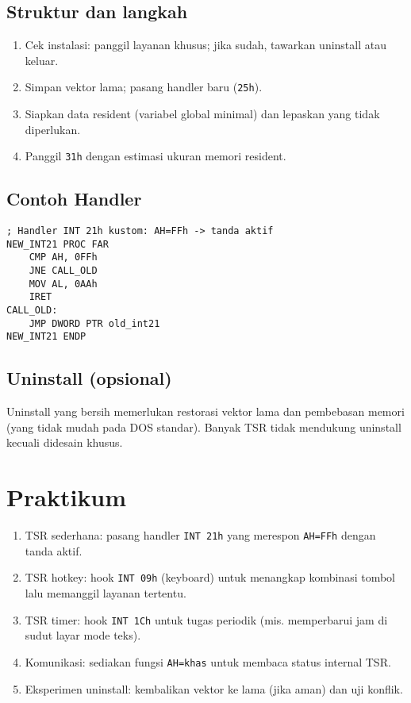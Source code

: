 \subsection{Struktur dan langkah}
\begin{enumerate}
  \item Cek instalasi: panggil layanan khusus; jika sudah, tawarkan uninstall atau keluar.
  \item Simpan vektor lama; pasang handler baru (\texttt{25h}).
  \item Siapkan data resident (variabel global minimal) dan lepaskan yang tidak diperlukan.
  \item Panggil \texttt{31h} dengan estimasi ukuran memori resident.
\end{enumerate}

\subsection{Contoh Handler}
\begin{verbatim}
; Handler INT 21h kustom: AH=FFh -> tanda aktif
NEW_INT21 PROC FAR
    CMP AH, 0FFh
    JNE CALL_OLD
    MOV AL, 0AAh
    IRET
CALL_OLD:
    JMP DWORD PTR old_int21
NEW_INT21 ENDP
\end{verbatim}

\subsection{Uninstall (opsional)}
Uninstall yang bersih memerlukan restorasi vektor lama dan pembebasan memori (yang tidak mudah pada DOS standar). Banyak TSR tidak mendukung uninstall kecuali didesain khusus.

\section{Praktikum}
\begin{enumerate}
  \item TSR sederhana: pasang handler \texttt{INT 21h} yang merespon \texttt{AH=FFh} dengan tanda aktif.
  \item TSR hotkey: hook \texttt{INT 09h} (keyboard) untuk menangkap kombinasi tombol lalu memanggil layanan tertentu.
  \item TSR timer: hook \texttt{INT 1Ch} untuk tugas periodik (mis. memperbarui jam di sudut layar mode teks).
  \item Komunikasi: sediakan fungsi \texttt{AH=khas} untuk membaca status internal TSR.
  \item Eksperimen uninstall: kembalikan vektor ke lama (jika aman) dan uji konflik.
\end{enumerate}

